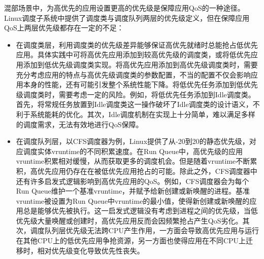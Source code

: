 
混部场景中，为高优先的应用设置更高的优先级是保障应用QoS的一种途径。Linux调度子系统中提供了调度类与调度队列两层的优先级定义，但在保障应用QoS上两层优先级都存在一定的不足：

\begin{itemize}

    \item 在调度类层，利用调度类的优先级差异能够保证高优先就绪时总能抢占低优先应用。具体实践中可将高优先应用添加到较高优先级的调度类，或将低优先应用添加到低优先级调度类实现。将高优先应用添加到高优先级调度类时，需要充分考虑应用的特点与高优先级调度类的参数配置，不当的配置不仅会影响应用本身的性能，还有可能引发整个系统性能下降。将低优先任务添加到低优先级调度类时，需要考虑一定的风险。例如，将低优先任务添加到Idle调度类。首先，将常规任务放置到Idle调度类这一操作破坏了Idle调度类的设计语义，不利于系统能耗的优化。其次，Idle调度机制在实现上十分简单，难以满足多样的调度需求，无法有效地进行QoS保障。

    \item 在调度队列层，以CFS调度器为例，Linux提供了从-20到20的静态优先级，对应调度实体vruntime的不同积累速度。在Run Queue中，高优先级的应用vruntime积累相对缓慢，从而获取更多的调度机会。但是随着vruntime不断累积，高优先应用仍存在在被低优先应用抢占的可能。除此之外，CFS调度器中还有许多启发式逻辑影响到高优先应用的QoS。例如，CFS调度器会为每个Run Queue维护一个基准vruntime，并赋予给新创建或新唤醒的进程。基准vruntime被设置为Run Queue中vruntime的最小值，使得新创建或新唤醒的应用总是能够优先被执行。这一启发式逻辑没有考虑到进程之间的优先级，当低优先级大量唤醒或创建时，高优先应用反而会因频繁抢占产生QoS劣化。其次，调度队列层优先级无法跨CPU产生作用，一方面会导致高优先应用与运行在其他CPU上的低优先应用争抢资源，另一方面也使得应用在不同CPU上迁移时，相对优先级变化导致优先性丧失。

\end{itemize}


